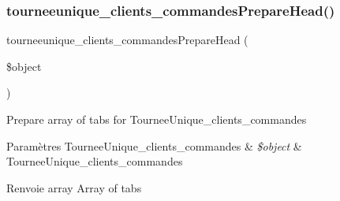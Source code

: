 \subsubsection{\texorpdfstring{tourneeunique\+\_\+clients\+\_\+commandes\+Prepare\+Head()}{tourneeunique\_clients\_commandesPrepareHead()}}
{\footnotesize\ttfamily tourneeunique\+\_\+clients\+\_\+commandes\+Prepare\+Head (\begin{DoxyParamCaption}\item[{}]{\$object }\end{DoxyParamCaption})}

Prepare array of tabs for Tournee\+Unique\+\_\+clients\+\_\+commandes


\begin{DoxyParams}[1]{Paramètres}
Tournee\+Unique\+\_\+clients\+\_\+commandes & {\em \$object} & Tournee\+Unique\+\_\+clients\+\_\+commandes \\
\hline
\end{DoxyParams}
\begin{DoxyReturn}{Renvoie}
array Array of tabs 
\end{DoxyReturn}
